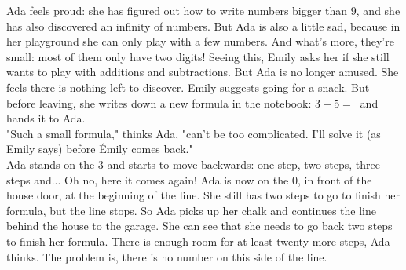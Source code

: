 Ada feels proud: she has figured out how to write numbers bigger than $9$, and she has also discovered an infinity of numbers. 
But Ada is also a little sad, because in her playground she can only play with a few numbers. And what's more, they're small: most of them only have two digits!
Seeing this, Emily asks her if she still wants to play with additions and subtractions. 
But Ada is no longer amused. She feels there is nothing left to discover. 
Emily suggests going for a snack. But before leaving, she writes down a new formula in the notebook: $3 - 5 = ~$ and hands it to Ada. \\
"Such a small formula," thinks Ada, "can't be too complicated. 
I'll solve it (as Emily says) before Émily comes back."\\ 
Ada stands on the $3$ and starts to move backwards: one step, two steps, three steps and... 
Oh no, here it comes again! Ada is now on the $0$, in front of the house door, at the beginning of the line. 
She still has two steps to go to finish her formula, but the line stops. 
So Ada picks up her chalk and continues the line behind the house to the garage. 
She can see that she needs to go back two steps to finish her formula. 
There is enough room for at least twenty more steps, Ada thinks. 
The problem is, there is no number on this side of the line. 

